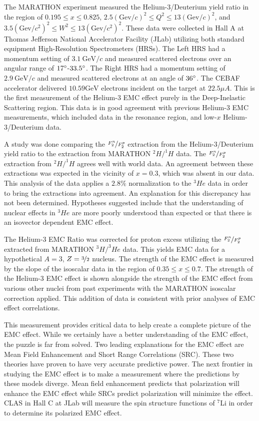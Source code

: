 The MARATHON experiment measured the Helium-3/Deuterium yield ratio in the region of $0.195 \leq x \leq 0.825$, $2.5 \left(\text{Gev}/c\right)^2 \leq Q^2 \leq 13 \left(\text{Gev}/c\right)^2$, and $3.5 \left(\text{Gev}/c^2\right)^2 \leq W^2 \leq 13 \left(\text{Gev}/c^2\right)^2$. These data were collected in Hall A at Thomas Jefferson National Accelerator Facility (JLab) utilizing both standard equipment High-Resolution Spectrometers (HRSs). The Left HRS had a momentum setting of $3.1\ \text{GeV}/c$ and measured scattered electrons over an angular range of $17\degree$-$33.5\degree$. The Right HRS had a momentum setting of $2.9\ \text{GeV}/c$ and measured scattered electrons at an angle of $36\degree$. The CEBAF accelerator delivered $10.59 \text{GeV}$ electrons incident on the target at $22.5\mu A$. This is the first measurement of the Helium-3 EMC effect purely in the Deep-Inelastic Scattering region. This data is in good agreement with previous Helium-3 EMC measurements, which included data in the resonance region, and low-$x$ Helium-3/Deuterium data.

A study was done comparing the $\nicefrac{F_2^n}{F_2^p}$ extraction from the Helium-3/Deuterium yield ratio to the extraction from MARATHON $^2H/^1H$ data. The $\nicefrac{F_2^n}{F_2^p}$ extraction from $^2H/^1H$ agrees well with world data. An agreement between these extractions was expected in the vicinity of $x=0.3$, which was absent in our data. This analysis of the data applies a $2.8\%$ normalization to the $^3He$ data in order to bring the extractions into agreement. An explanation for this discrepancy has not been determined. Hypotheses suggested include that the understanding of nuclear effects in $^3He$ are more poorly understood than expected or that there is an isovector dependent EMC effect.

The Helium-3 EMC Ratio was corrected for proton excess utilizing the $\nicefrac{F_2^n}{F_2^p}$ extracted from MARATHON $^3H/^3He$ data. This yields EMC data for a hypothetical $A=3$, $Z=\nicefrac{3}{2}$ nucleus. The strength of the EMC effect is measured by the slope of the isoscalar data in the region of $0.35 \leq x \leq 0.7$. The strength of the Helium-3 EMC effect is shown alongside the strength of the EMC effect from various other nuclei from past experiments with the MARATHON isoscalar correction applied. This addition of data is consistent with prior analyses of EMC effect correlations.

This measurement provides critical data to help create a complete picture of the EMC effect. While we certainly have a better understanding of the EMC effect, the puzzle is far from solved. Two leading explanations for the EMC effect are Mean Field Enhancement and Short Range Correlations (SRC). These two theories have proven to have very accurate predictive power. The next frontier in studying the EMC effect is to make a measurement where the predictions by these models diverge. Mean field enhancement predicts that polarization will enhance the EMC effect while SRCs predict polarization will minimize the effect. CLAS in Hall C at JLab will measure the spin structure functions of $^7$Li in order to determine its polarized EMC effect.